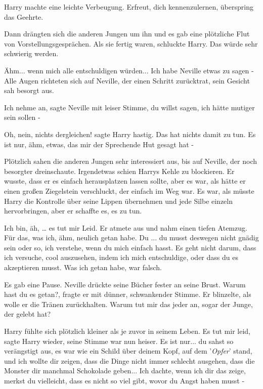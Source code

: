 Harry machte eine leichte Verbeugung. \glqq{}Erfreut, dich kennenzulernen,
überspring das Geehrte.\grqq{}

Dann drängten sich die anderen Jungen um ihn und es gab eine plötzliche Flut von
Vorstellungsgesprächen. Als sie fertig waren, schluckte Harry. Das würde sehr
schwierig werden.

\glqq{}Ähm... wenn mich alle entschuldigen würden... Ich habe Neville etwas zu
sagen -\grqq{} Alle Augen richteten sich auf Neville, der einen Schritt
zurücktrat, sein Gesicht sah besorgt aus.

\glqq{}Ich nehme an\grqq{}, sagte Neville mit leiser Stimme, \glqq{}du willst
sagen, ich hätte mutiger sein sollen -\grqq{}

\glqq{}Oh, nein, nichts dergleichen!\grqq{} sagte Harry hastig. \glqq{}Das hat
nichts damit zu tun. Es ist nur, ähm, etwas, das mir der Sprechende Hut gesagt
hat -\grqq{}

Plötzlich sahen die anderen Jungen sehr interessiert aus, bis auf Neville, der
noch besorgter dreinschaute. Irgendetwas schien Harrys Kehle zu blockieren. Er
wusste, dass er es einfach herausplatzen lassen sollte, aber es war, als hätte
er einen großen Ziegelstein verschluckt, der einfach im Weg war. Es war, als
müsste Harry die Kontrolle über seine Lippen übernehmen und jede Silbe einzeln
hervorbringen, aber er schaffte es, es zu tun.

\glqq{}Ich bin, äh, … es tut mir Leid.\grqq{} Er atmete aus und nahm einen tiefen
Atemzug. \glqq{}Für das, was ich, ähm, neulich getan habe. Du ... du musst
deswegen nicht gnädig sein oder so, ich verstehe, wenn du mich einfach hasst. Es
geht nicht darum, dass ich versuche, cool auszusehen, indem ich mich
entschuldige, oder dass du es akzeptieren musst. Was ich getan habe, war
falsch.\grqq{}

Es gab eine Pause. Neville drückte seine Bücher fester an seine Brust. \glqq
Warum hast du es getan?\grqq{}, fragte er mit dünner, schwankender Stimme. Er
blinzelte, als wolle er die Tränen zurückhalten. \glqq{}Warum tut mir das jeder
an, sogar der Junge, der gelebt hat?\grqq{}

Harry fühlte sich plötzlich kleiner als je zuvor in seinem Leben. \glqq{}Es tut
mir leid\grqq{}, sagte Harry wieder, seine Stimme war nun heiser. \glqq{}Es ist
nur... du sahst so verängstigt aus, es war wie ein Schild über deinem Kopf, auf
dem '\emph{Opfer}' stand, und ich wollte dir zeigen, dass die Dinge nicht immer
schlecht ausgehen, dass die Monster dir manchmal Schokolade geben... Ich dachte,
wenn ich dir das zeige, merkst du vielleicht, dass es nicht so viel gibt, wovor
du Angst haben musst -\grqq{}

